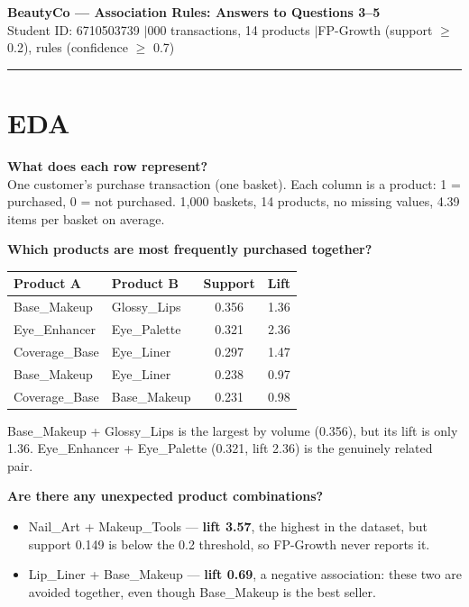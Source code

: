 \documentclass[11pt,a4paper]{article}
\newcommand{\pcode}[1]{{\codefont\small #1}}
\begin{document}
\begin{center}
{\sffamily\large\bfseries BeautyCo — Association Rules: Answers to Questions 3--5}\\[3pt]
{\sffamily\small Student ID: 6710503739 \quad$\vert$000 transactions, 14 products
\quad$\vert$\quad FP-Growth (support $\geq$ 0.2), rules (confidence $\geq$ 0.7)}
\end{center}
\vspace{2pt}\hrule

\section{EDA}

\textbf{What does each row represent?}\\
One customer's purchase transaction (one basket). Each column is a product:
\pcode{1} = purchased, \pcode{0} = not purchased. 1,000 baskets, 14 products, no missing values,
4.39 items per basket on average.

\textbf{Which products are most frequently purchased together?}

\begin{center}
\begin{tabular}{llcc}
\toprule
\textbf{Product A} & \textbf{Product B} & \textbf{Support} & \textbf{Lift} \\
\midrule
Base\_Makeup   & Glossy\_Lips  & 0.356 & 1.36 \\
Eye\_Enhancer  & Eye\_Palette  & 0.321 & 2.36 \\
Coverage\_Base & Eye\_Liner    & 0.297 & 1.47 \\
Base\_Makeup   & Eye\_Liner    & 0.238 & 0.97 \\
Coverage\_Base & Base\_Makeup  & 0.231 & 0.98 \\
\bottomrule
\end{tabular}
\end{center}

\pcode{Base\_Makeup + Glossy\_Lips} is the largest by volume (0.356), but its lift is only 1.36.
\pcode{Eye\_Enhancer + Eye\_Palette} (0.321, lift 2.36) is the genuinely related pair.

\textbf{Are there any unexpected product combinations?}

\begin{itemize}[leftmargin=*]
  \item \pcode{Nail\_Art + Makeup\_Tools} — \textbf{lift 3.57}, the highest in the dataset, but
  support 0.149 is below the 0.2 threshold, so FP-Growth never reports it.
  \item \pcode{Lip\_Liner + Base\_Makeup} — \textbf{lift 0.69}, a negative association: these two
  are avoided together, even though Base\_Makeup is the best seller.
\end{itemize}
\end{document}
